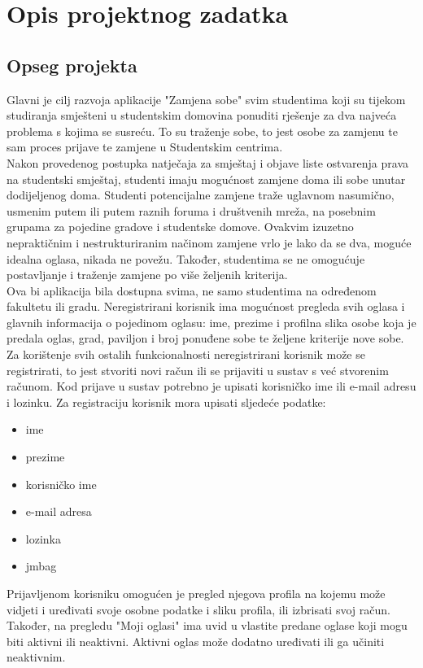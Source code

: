 \chapter{Opis projektnog zadatka}
		
		\section{Opseg projekta}
		
		Glavni je cilj razvoja aplikacije "Zamjena sobe" svim studentima koji su tijekom studiranja smješteni u studentskim domovina ponuditi rješenje za dva najveća problema s kojima se susreću. To su traženje sobe, to jest osobe za zamjenu te sam proces prijave te zamjene u Studentskim centrima.\\
		Nakon provedenog postupka natječaja za smještaj i objave liste ostvarenja prava na studentski smještaj, studenti imaju mogućnost zamjene doma ili sobe unutar dodijeljenog doma. 
		Studenti potencijalne zamjene traže uglavnom nasumično, usmenim putem ili putem raznih foruma i društvenih mreža, na posebnim grupama za pojedine gradove i studentske domove. Ovakvim izuzetno nepraktičnim i nestrukturiranim načinom zamjene vrlo je lako da se dva, moguće idealna oglasa, nikada ne povežu. Također, studentima se ne omogućuje postavljanje i traženje zamjene po više željenih kriterija.\\ 
		Ova bi aplikacija bila dostupna svima, ne samo studentima na određenom fakultetu ili gradu. Neregistrirani korisnik ima mogućnost pregleda svih oglasa i glavnih informacija o pojedinom oglasu: ime, prezime i profilna slika osobe koja je predala oglas, grad, paviljon i broj ponuđene sobe te željene kriterije nove sobe. Za korištenje svih ostalih funkcionalnosti neregistrirani korisnik može se registrirati, to jest stvoriti novi račun ili se prijaviti u sustav s već stvorenim računom. Kod prijave u sustav potrebno je upisati korisničko ime ili e-mail adresu i lozinku. Za registraciju korisnik mora upisati sljedeće podatke: 
		\begin{itemize}
			\item ime
			\item prezime
			\item korisničko ime
			\item e-mail adresa
			\item lozinka
			\item jmbag
		\end{itemize} 
		Prijavljenom korisniku omogućen je pregled njegova profila na kojemu može vidjeti i uređivati svoje osobne podatke i sliku profila, ili izbrisati svoj račun. Također, na pregledu "Moji oglasi" ima uvid u vlastite predane oglase koji mogu biti aktivni ili neaktivni. Aktivni oglas može dodatno uređivati ili ga učiniti neaktivnim.\\
